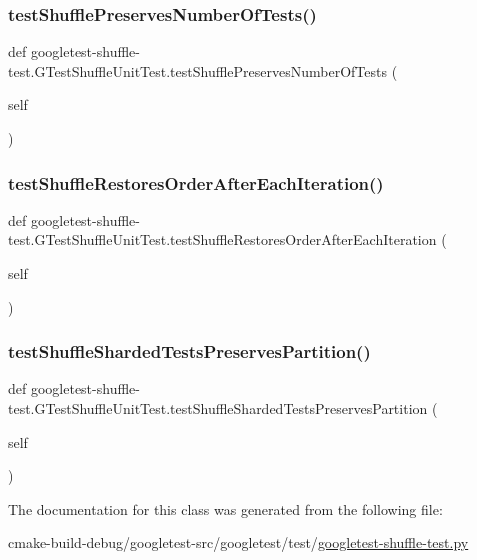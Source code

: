 \subsubsection{\texorpdfstring{testShufflePreservesNumberOfTests()}{testShufflePreservesNumberOfTests()}}
{\footnotesize\ttfamily def googletest-\/shuffle-\/test.\+G\+Test\+Shuffle\+Unit\+Test.\+test\+Shuffle\+Preserves\+Number\+Of\+Tests (\begin{DoxyParamCaption}\item[{}]{self }\end{DoxyParamCaption})}

\mbox{\label{classgoogletest-shuffle-test_1_1GTestShuffleUnitTest_a04c8c704394572758647c8133e51e445}} 
\subsubsection{\texorpdfstring{testShuffleRestoresOrderAfterEachIteration()}{testShuffleRestoresOrderAfterEachIteration()}}
{\footnotesize\ttfamily def googletest-\/shuffle-\/test.\+G\+Test\+Shuffle\+Unit\+Test.\+test\+Shuffle\+Restores\+Order\+After\+Each\+Iteration (\begin{DoxyParamCaption}\item[{}]{self }\end{DoxyParamCaption})}

\mbox{\label{classgoogletest-shuffle-test_1_1GTestShuffleUnitTest_a9e21814173c0822718d74c79c10e3b21}} 
\subsubsection{\texorpdfstring{testShuffleShardedTestsPreservesPartition()}{testShuffleShardedTestsPreservesPartition()}}
{\footnotesize\ttfamily def googletest-\/shuffle-\/test.\+G\+Test\+Shuffle\+Unit\+Test.\+test\+Shuffle\+Sharded\+Tests\+Preserves\+Partition (\begin{DoxyParamCaption}\item[{}]{self }\end{DoxyParamCaption})}



The documentation for this class was generated from the following file\+:\begin{DoxyCompactItemize}
\item 
cmake-\/build-\/debug/googletest-\/src/googletest/test/\mbox{\hyperlink{googletest-shuffle-test_8py}{googletest-\/shuffle-\/test.\+py}}\end{DoxyCompactItemize}
